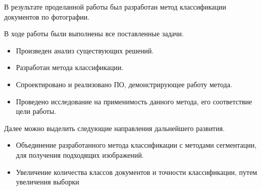 \Conclusion %

В результате проделанной работы был разработан метод классификации документов по фотографии. 

В ходе работы были выполнены все поставленные задачи.
\begin{itemize}
\item Произведен анализ существующих решений.
\item Разработан метода классификации.
\item Спроектировано и реализовано ПО, демонстрирующее работу метода.
\item Проведено исследование на применимость данного метода, его соответ­ствие цели работы.
\end{itemize}

Далее можно выделить следующие направления дальнейшего развития.
\begin{itemize}
\item Объединение разработанного метода классификации с методами сегментации, для получения подходящих изображений.
\item Увеличение количества классов документов и точности классификации, путем увеличения выборки
\end{itemize}
